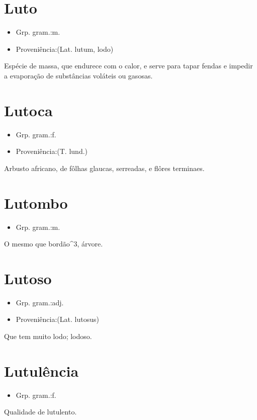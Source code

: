\section{Luto}
\begin{itemize}
\item {Grp. gram.:m.}
\end{itemize}
\begin{itemize}
\item {Proveniência:(Lat. \textunderscore lutum\textunderscore , lodo)}
\end{itemize}
Espécie de massa, que endurece com o calor, e serve para tapar fendas e impedir a evaporação de substâncias voláteis ou gasosas.
\section{Lutoca}
\begin{itemize}
\item {Grp. gram.:f.}
\end{itemize}
\begin{itemize}
\item {Proveniência:(T. lund.)}
\end{itemize}
Arbusto africano, de fôlhas glaucas, serreadas, e flôres terminaes.
\section{Lutombo}
\begin{itemize}
\item {Grp. gram.:m.}
\end{itemize}
O mesmo que \textunderscore bordão\textunderscore ^3, árvore.
\section{Lutoso}
\begin{itemize}
\item {Grp. gram.:adj.}
\end{itemize}
\begin{itemize}
\item {Proveniência:(Lat. \textunderscore lutosus\textunderscore )}
\end{itemize}
Que tem muito lodo; lodoso.
\section{Lutulência}
\begin{itemize}
\item {Grp. gram.:f.}
\end{itemize}
Qualidade de lutulento.

